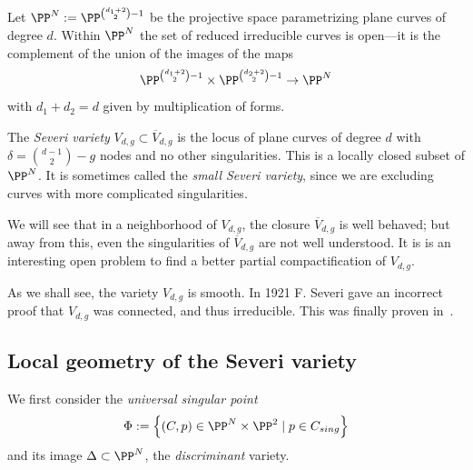 \def\Vdg{{V_{d,g}}}
\def\Vdgbar{{\overline{V}_{d,g}}} 

Let $\PP^N := \PP^{{d_1+2\choose 2} - 1}$ be the projective space parametrizing plane curves of degree $d$.
Within $\PP^N$ the set of reduced irreducible curves is open---it is the complement of the union of the images of the maps 
$$
\PP^{{d_1+2\choose 2} - 1}\times\PP^{{d_2+2\choose 2}-1} \to \PP^N
$$ 
with $d_1+d_2 = d$ given by multiplication of forms. 

\begin{propdef}
The \emph{Severi variety} $V_{d,g} \subset \Vdgbar$ is the locus of plane curves of degree $d$ with $\delta = \binom{d-1}{2} - g$ nodes and no other singularities. This is a locally closed subset of $\PP^N$. It is sometimes
called the \emph{small Severi variety}, since we are excluding curves with more complicated singularities.
\end{propdef}


We will see that in a neighborhood of  $ {V}_{d,g}$,  the closure $\overline V_{d,g}$  is well behaved; but away from this,
even the singularities of $\overline V_{d,g}$  are not well understood. It is is an interesting open problem to find a better partial compactification of $ V_{d,g}$. 


\begin{fact}
As we shall see, the variety $V_{d,g}$ is smooth. In 1921 F. Severi gave an incorrect proof that $\Vdg$ was connected, and thus irreducible. This was finally proven in~\cite{MR837522}.
\end{fact}


\subsection{Local geometry of the Severi variety}\label{local severi geometry}

We first consider the \emph{universal singular point}
$$
\Phi := \left\{ (C, p) \in \PP^N \times \PP^2 \mid p \in C_{sing} \right\}
$$
and its image $\Delta\subset \PP^N$, the \emph{discriminant} variety. 

